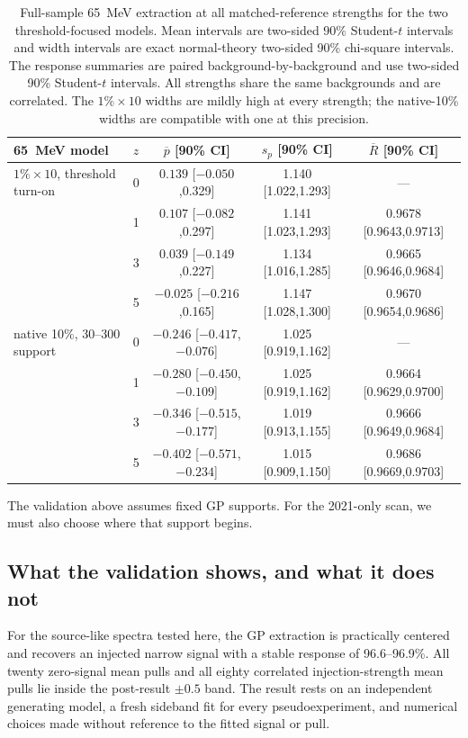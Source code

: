 \begin{table}[htbp]
\centering
\small
\begin{tabular}{llccc}
\toprule
65~MeV model & $z$ & $\overline p$ [90\% CI] & $s_p$ [90\% CI] & $\overline R$ [90\% CI] \\
\midrule
$1\%\times10$, threshold turn-on & 0 & $0.139$ [$-0.050$,0.329] & 1.140 [1.022,1.293] & --- \\
 & 1 & $0.107$ [$-0.082$,0.297] & 1.141 [1.023,1.293] & 0.9678 [0.9643,0.9713] \\
 & 3 & $0.039$ [$-0.149$,0.227] & 1.134 [1.016,1.285] & 0.9665 [0.9646,0.9684] \\
 & 5 & $-0.025$ [$-0.216$,0.165] & 1.147 [1.028,1.300] & 0.9670 [0.9654,0.9686] \\
\addlinespace
native 10\%, 30--300 support & 0 & $-0.246$ [$-0.417$,$-0.076$] & 1.025 [0.919,1.162] & --- \\
 & 1 & $-0.280$ [$-0.450$,$-0.109$] & 1.025 [0.919,1.162] & 0.9664 [0.9629,0.9700] \\
 & 3 & $-0.346$ [$-0.515$,$-0.177$] & 1.019 [0.913,1.155] & 0.9666 [0.9649,0.9684] \\
 & 5 & $-0.402$ [$-0.571$,$-0.234$] & 1.015 [0.909,1.150] & 0.9686 [0.9669,0.9703] \\
\bottomrule
\end{tabular}
\caption{Full-sample 65~MeV extraction at all matched-reference strengths for the two
threshold-focused models. Mean intervals are two-sided 90\% Student-$t$ intervals and
width intervals are exact normal-theory two-sided 90\% chi-square intervals.  The
response summaries are paired background-by-background and use two-sided 90\%
Student-$t$ intervals.  All strengths share the same backgrounds and are correlated.  The
$1\%\times10$ widths are mildly high at every strength; the native-10\% widths are
compatible with one at this precision.}
\label{tab:v491-injection-recovery}
\end{table}

\ifwritingsample
The validation above assumes fixed GP supports. For the 2021-only scan, we must also
choose where that support begins.


\fi

\subsection{What the validation shows, and what it does not}

For the source-like spectra tested here, the GP extraction is practically centered and
recovers an injected narrow signal with a stable response of 96.6--96.9\%. All twenty
zero-signal mean pulls and all eighty correlated injection-strength mean pulls lie
inside the post-result $\pm0.5$ band. The result rests on an independent generating
model, a fresh sideband fit for every pseudoexperiment, and numerical choices made
without reference to the fitted signal or pull.

